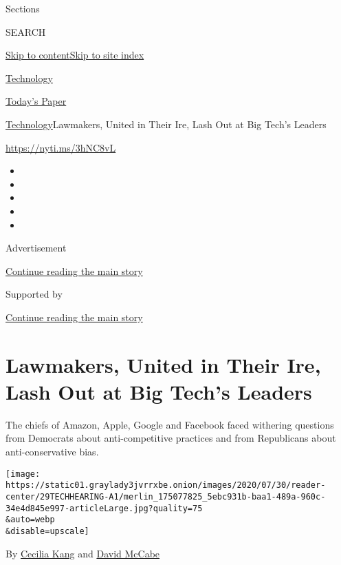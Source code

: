 Sections

SEARCH

\protect\hyperlink{site-content}{Skip to
content}\protect\hyperlink{site-index}{Skip to site index}

\href{https://www.nytimes3xbfgragh.onion/section/technology}{Technology}

\href{https://myaccount.nytimes3xbfgragh.onion/auth/login?response_type=cookie\&client_id=vi}{}

\href{https://www.nytimes3xbfgragh.onion/section/todayspaper}{Today's
Paper}

\href{/section/technology}{Technology}\textbar{}Lawmakers, United in
Their Ire, Lash Out at Big Tech's Leaders

\url{https://nyti.ms/3hNC8vL}

\begin{itemize}
\item
\item
\item
\item
\item
\end{itemize}

Advertisement

\protect\hyperlink{after-top}{Continue reading the main story}

Supported by

\protect\hyperlink{after-sponsor}{Continue reading the main story}

\hypertarget{lawmakers-united-in-their-ire-lash-out-at-big-techs-leaders}{%
\section{Lawmakers, United in Their Ire, Lash Out at Big Tech's
Leaders}\label{lawmakers-united-in-their-ire-lash-out-at-big-techs-leaders}}

The chiefs of Amazon, Apple, Google and Facebook faced withering
questions from Democrats about anti-competitive practices and from
Republicans about anti-conservative bias.

\texttt{[image: https://static01.graylady3jvrrxbe.onion/images/2020/07/30/reader-center/29TECHHEARING-A1/merlin\_175077825\_5ebc931b-baa1-489a-960c-34e4d845e997-articleLarge.jpg?quality=75\\\&auto=webp\\\&disable=upscale]}

By \href{https://www.nytimes3xbfgragh.onion/by/cecilia-kang}{Cecilia
Kang} and
\href{https://www.nytimes3xbfgragh.onion/by/david-mccabe}{David McCabe}

